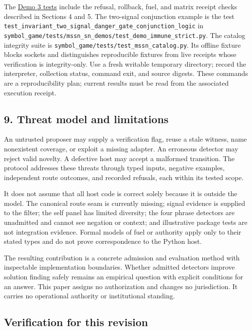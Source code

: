 \documentclass[
  11pt,
]{article}
\begin{document}
The
\href{https://github.com/dbccpage/the_symbol_game/blob/52cb5457f6c485ba548cfd292f6012a941ed22cf/symbol_game/tests/mssn_sn_demos/test_demo_3.py}{Demo
3 tests} include the refusal, rollback, fuel, and matrix receipt checks
described in Sections 4 and 5. The two-signal conjunction example is the
test \nolinkurl{test_invariant_two_signal_danger_gate_conjunction_logic}
in
\nolinkurl{symbol_game/tests/mssn_sn_demos/test_demo_immune_strict.py}.
The catalog integrity suite is
\nolinkurl{symbol_game/tests/test_mssn_catalog.py}. Its
offline fixture blocks sockets and distinguishes reproducible fixtures
from live receipts whose verification is integrity-only. Use a fresh
writable temporary directory; record the interpreter, collection status,
command exit, and source digests. These commands are a reproducibility
plan; current results must be read from the associated execution
receipt.

\subsection{9. Threat model and
limitations}\label{threat-model-and-limitations}

An untrusted proposer may supply a verification flag, reuse a stale
witness, name nonexistent coverage, or exploit a missing adapter. An
erroneous detector may reject valid novelty. A defective host may accept
a malformed transition. The protocol addresses these threats through
typed inputs, negative examples, independent route outcomes, and
recorded refusals, each within its tested scope.

It does not assume that all host code is correct solely because it is
outside the model. The canonical route seam is currently missing; signal
evidence is supplied to the filter; the self panel has limited
diversity; the four phrase detectors are unadmitted and cannot see
negation or context; and illustrative package tests are not integration
evidence. Formal models of fuel or authority apply only to their stated
types and do not prove correspondence to the Python host.

The resulting contribution is a concrete admission and evaluation method
with inspectable implementation boundaries. Whether admitted detectors
improve solution finding safely remains an empirical question with
explicit conditions for an answer. This paper assigns no authorization
and changes no jurisdiction. It carries no operational authority or
institutional standing.

\subsection{Verification for this
revision}\label{verification-for-this-revision}
\end{document}

